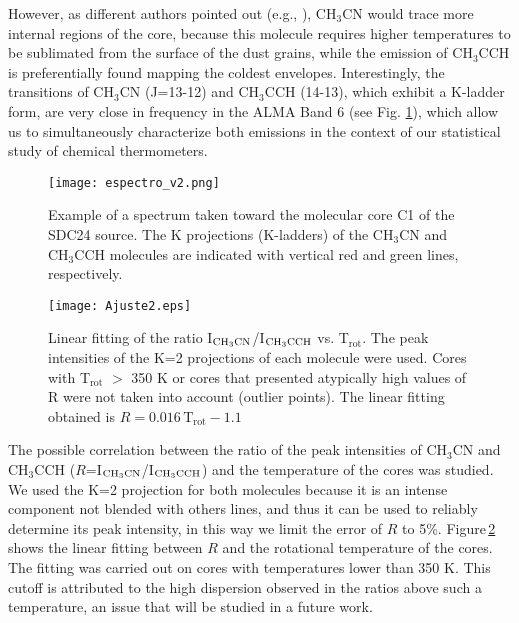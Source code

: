 \documentclass[baaa]{baaa}
\begin{document}
However, as different authors pointed out (e.g., \citealt{tycho2021}), CH$_3$CN would trace more internal regions of the core, because this molecule requires  higher temperatures to be sublimated from the surface of the dust grains, while the emission of CH$_3$CCH is preferentially found mapping the coldest envelopes. Interestingly, the transitions of CH$_3$CN (J=13-12) and CH$_3$CCH (14-13), which exhibit a K-ladder form,  are very close in frequency in the ALMA Band 6 (see Fig. \ref{Figura2}), which allow us to simultaneously characterize both emissions in the context of our statistical study of chemical thermometers.

\begin{figure}[!t]
\centering
\texttt{[image: espectro\_v2.png]}
\caption{Example of a spectrum taken toward the molecular core C1 of the SDC24 source. The K projections (K-ladders) of the CH$_3$CN and CH$_3$CCH molecules are indicated with vertical red and green lines, respectively.}
\label{Figura2}
\end{figure}

\begin{figure}[!t]
\centering
\texttt{[image: Ajuste2.eps]}
\caption{ Linear fitting of the ratio I$_{\rm CH_3CN}$/I$_{\rm CH_3CCH}$ vs. T$_\mathrm{rot}$. The peak intensities of the K=2 projections of each molecule were used. Cores with T$_\mathrm{rot}$ $>$ 350 K or cores that presented atypically high values of R were not taken into account (outlier points). The linear fitting obtained is $R=0.016\, \mathrm{T_{rot}} - 1.1$}
\label{Figura3}
\end{figure}

The possible correlation between the ratio of the peak intensities of CH$_{3}$CN and CH$_{3}$CCH ($R$=I$_{\rm CH_3CN}$/I$_{\rm CH_3CCH}$) and the temperature of the cores was studied. We used the K=2 projection for both molecules because it is an intense component not blended with others lines, and thus it can be used to reliably determine its peak intensity, in this way we limit the error of $R$ to 5\%.
Figure\,\ref{Figura3} shows the linear fitting between $R$ and the rotational temperature of the cores. The fitting was carried out on cores with temperatures lower than 350 K. This cutoff is attributed to the high dispersion observed in the ratios above such a temperature, an issue that will be studied in a future work.
\end{document}
